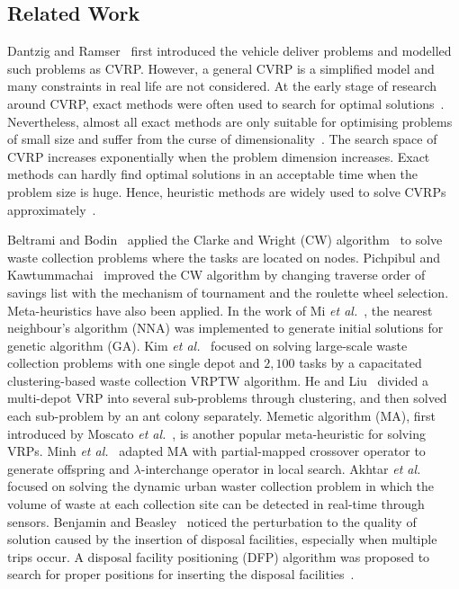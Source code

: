 \documentclass[journal]{IEEEtran}
\begin{document}
\subsection{Related Work}%
Dantzig and Ramser~\cite{dantzig1959truck} first introduced the vehicle deliver problems and modelled such problems as CVRP. However, a general CVRP is a simplified model and many constraints in real life are not considered. At the early stage of research around CVRP, exact methods were often used to search for optimal solutions~\cite{baldacci2012recent, martello2000three}. Nevertheless, almost all exact methods are only suitable for optimising problems of small size and suffer from the curse of dimensionality~\cite{martello2007algorithm,akhtar2017backtracking}. The search space of CVRP increases exponentially when the problem dimension increases. Exact methods can hardly find optimal solutions in an acceptable time when the problem size is huge. Hence, heuristic methods are widely used to solve CVRPs approximately~\cite{taillard1999heuristic,tan2001heuristic,laporte2002classical}. 

Beltrami and Bodin~\cite{beltrami1974networks} applied the Clarke and Wright (CW) algorithm~\cite{clarke1964scheduling} to solve waste collection problems where the tasks are located on nodes. Pichpibul and Kawtummachai~\cite{pichpibul2012an} improved the CW algorithm by changing traverse order of savings list with the mechanism of tournament and the roulette wheel selection. Meta-heuristics have also been applied.
In the work of Mi \emph{et al.}~\cite{mi2017optimization}, the nearest neighbour's algorithm (NNA) was implemented to generate initial solutions for genetic algorithm (GA).
Kim \emph{et al.}~\cite{kim2006waste} focused on solving large-scale waste collection problems with one single depot and $2,100$ tasks by a capacitated clustering-based waste collection VRPTW algorithm. He and Liu~\cite{Liu2012A} divided a multi-depot VRP into several sub-problems through clustering, and then solved each sub-problem by an ant colony separately. Memetic algorithm (MA), first introduced by Moscato \emph{et al.}~\cite{moscato1989evolution}, is another popular meta-heuristic for solving VRPs. Minh \emph{et al.}~\cite{minh2013memetic} adapted MA with partial-mapped crossover operator to generate offspring and $\lambda$-interchange operator in local search. Akhtar \emph{et al.}~\cite{akhtar2017backtracking} focused on solving the dynamic urban waster collection problem in which the volume of waste at each collection site can be detected in real-time through sensors. Benjamin and Beasley~\cite{benjamin2013metaheuristics} noticed the perturbation to the quality of solution caused by the insertion of disposal facilities, especially when multiple trips occur. A disposal facility positioning (DFP) algorithm was proposed to search for proper positions for inserting the disposal facilities~\cite{benjamin2013metaheuristics}.
\end{document}
